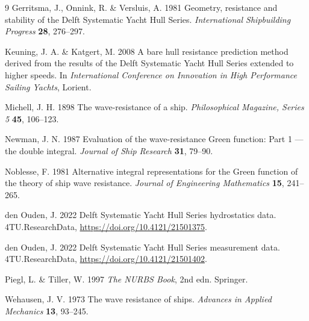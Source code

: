 \documentclass[11pt]{article}
\begin{document}
\begin{thebibliography}{9}
Gerritsma, J., Onnink, R. \& Versluis, A. 1981
Geometry, resistance and stability of the Delft Systematic Yacht Hull Series.
\textit{International Shipbuilding Progress} \textbf{28}, 276--297.

Keuning, J. A. \& Katgert, M. 2008
A bare hull resistance prediction method derived from the results of the Delft
Systematic Yacht Hull Series extended to higher speeds.
In \textit{International Conference on Innovation in High Performance Sailing Yachts},
Lorient.

Michell, J. H. 1898
The wave-resistance of a ship.
\textit{Philosophical Magazine, Series 5} \textbf{45}, 106--123.

Newman, J. N. 1987
Evaluation of the wave-resistance Green function: Part 1 --- the double integral.
\textit{Journal of Ship Research} \textbf{31}, 79--90.

Noblesse, F. 1981
Alternative integral representations for the Green function of the theory of ship
wave resistance.
\textit{Journal of Engineering Mathematics} \textbf{15}, 241--265.

den Ouden, J. 2022
Delft Systematic Yacht Hull Series hydrostatics data.
4TU.ResearchData, \url{https://doi.org/10.4121/21501375}.

den Ouden, J. 2022
Delft Systematic Yacht Hull Series measurement data.
4TU.ResearchData, \url{https://doi.org/10.4121/21501402}.

Piegl, L. \& Tiller, W. 1997
\textit{The NURBS Book}, 2nd edn. Springer.

Wehausen, J. V. 1973
The wave resistance of ships.
\textit{Advances in Applied Mechanics} \textbf{13}, 93--245.
\end{thebibliography}
\end{document}
